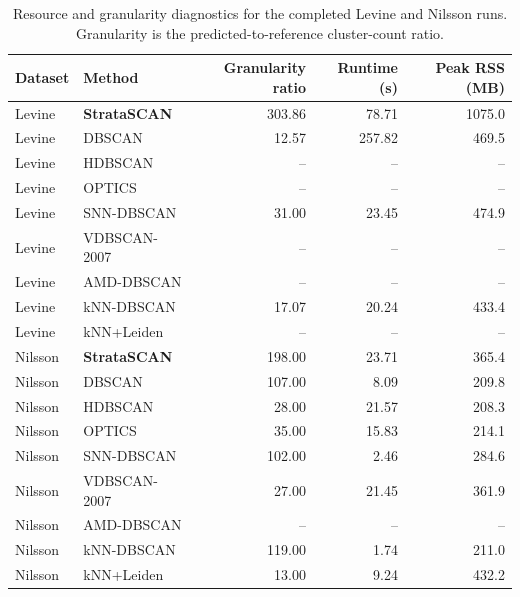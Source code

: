 \begin{table}[t]
\centering
\caption{Resource and granularity diagnostics for the completed Levine and Nilsson runs. Granularity is the predicted-to-reference cluster-count ratio.}
\label{tab:biology-levine-nilsson-resources}
\setlength{\tabcolsep}{4pt}
\begin{tabular}{llrrr}
\toprule
Dataset & Method & Granularity ratio & Runtime (s) & Peak RSS (MB) \\
\midrule
Levine & \textbf{StrataSCAN} & 303.86 & 78.71 & 1075.0 \\
Levine & DBSCAN & 12.57 & 257.82 & 469.5 \\
Levine & HDBSCAN & -- & -- & -- \\
Levine & OPTICS & -- & -- & -- \\
Levine & SNN-DBSCAN & 31.00 & 23.45 & 474.9 \\
Levine & VDBSCAN-2007 & -- & -- & -- \\
Levine & AMD-DBSCAN & -- & -- & -- \\
Levine & kNN-DBSCAN & 17.07 & 20.24 & 433.4 \\
Levine & kNN+Leiden & -- & -- & -- \\
\midrule
Nilsson & \textbf{StrataSCAN} & 198.00 & 23.71 & 365.4 \\
Nilsson & DBSCAN & 107.00 & 8.09 & 209.8 \\
Nilsson & HDBSCAN & 28.00 & 21.57 & 208.3 \\
Nilsson & OPTICS & 35.00 & 15.83 & 214.1 \\
Nilsson & SNN-DBSCAN & 102.00 & 2.46 & 284.6 \\
Nilsson & VDBSCAN-2007 & 27.00 & 21.45 & 361.9 \\
Nilsson & AMD-DBSCAN & -- & -- & -- \\
Nilsson & kNN-DBSCAN & 119.00 & 1.74 & 211.0 \\
Nilsson & kNN+Leiden & 13.00 & 9.24 & 432.2 \\
\bottomrule
\end{tabular}
\end{table}
